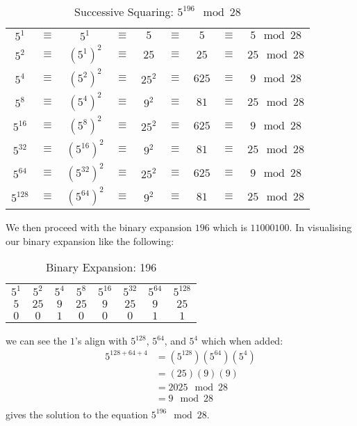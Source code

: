 \documentclass{article}
\begin{document}
\begin{table}[H]
    \centering
    \begin{tabular}{ccccccccc}
         $5^1$&  $\equiv$&  $5^1$&  $\equiv$&  $5$&  $\equiv$&  $5$&  $\equiv$& $5 \mod 28$\\
         $5^2$&  $\equiv$&  $(5^1)^2$&  $\equiv$&  $25$&  $\equiv$&  $25$&  $\equiv$& $25 \mod 28$\\
         $5^4$&  $\equiv$&  $(5^2)^2$&  $\equiv$&  $25^2$&  $\equiv$&  $625$&  $\equiv$& $9 \mod 28$\\
         $5^8$&  $\equiv$&  $(5^4)^2$&  $\equiv$&  $9^2$&  $\equiv$&  $81$&  $\equiv$& $25 \mod 28$\\
         $5^{16}$&  $\equiv$&  $(5^8)^2$&  $\equiv$&  $25^2$&  $\equiv$&  $625$&  $\equiv$& $9 \mod 28$\\
         $5^{32}$&  $\equiv$&  $(5^{16})^2$&  $\equiv$&  $9^2$&  $\equiv$&  $81$&  $\equiv$& $25 \mod 28$\\
         $5^{64}$&  $\equiv$&  $(5^{32})^2$&  $\equiv$&  $25^2$&  $\equiv$&  $625$&  $\equiv$& $9 \mod 28$\\
         $5^{128}$&  $\equiv$&  $(5^{64})^2$&  $\equiv$&  $9^2$&  $\equiv$&  $81$&  $\equiv$& $25 \mod 28$\\
    \end{tabular}
    \caption{Successive Squaring: $5^{196} \mod 28$}
\end{table}

We then proceed with the binary expansion $196$ which is $11000100$. In visualising our binary expansion like the following:

\begin{table}[H]
    \centering
    \begin{tabular}{cccccccc}
         $5^1$&  $5^2$&  $5^4$&  $5^8$&  $5^{16}$&  $5^{32}$&  $5^{64}$& $5^{128}$\\
         $5$&  $25$&  $9$&  $25$&  $9$&  $25$&  $9$& $25$\\
         $0$&  $0$&  $1$&  $0$&  $0$&  $0$&  $1$& $1$\\
    \end{tabular}
    \caption{Binary Expansion: 196}
\end{table}
we can see the $1$'s align with $5^{128}$, $5^{64}$, and $5^{4}$ which when added:
\begin{equation}
\begin{aligned}
    5^{128+64+4} & = (5^{128})(5^{64})(5^4)\\
    &= (25)(9)(9)\\
    &= 2025\mod 28\\
    &= 9\mod 28\\
    \end{aligned}
\end{equation}
gives the solution to the equation $5^{196} \mod 28$.
\end{document}

